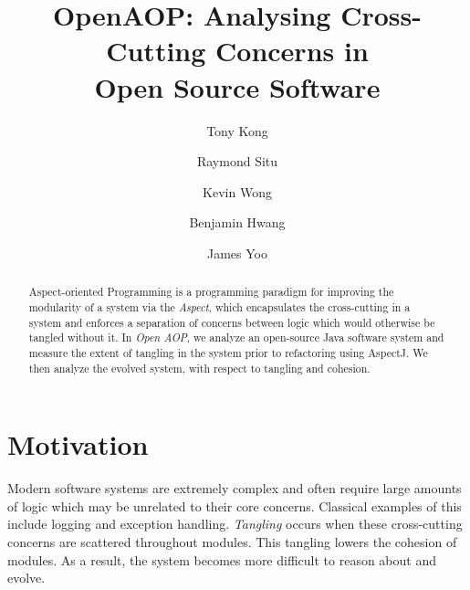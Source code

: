 \documentclass[sigconf]{acmart}
\begin{document}
\title{OpenAOP: Analysing Cross-Cutting Concerns in \protect\\ Open Source Software}

\author{Tony Kong}

\author{Raymond Situ}

\author{Kevin Wong}

\author{Benjamin Hwang}

\author{James Yoo}

\begin{abstract}
Aspect-oriented Programming is a programming paradigm for improving the modularity of a system via the \textit{Aspect}, which encapsulates the cross-cutting in a system and enforces a separation of concerns between logic which would otherwise be tangled without it. In \textit{Open AOP}, we analyze an open-source Java software system and measure the extent of tangling in the system prior to refactoring using AspectJ. We then analyze the evolved system, with respect to tangling and cohesion.
\end{abstract}

\maketitle

\section{Motivation}
Modern software systems are extremely complex and often require large amounts of logic which may be unrelated to their core concerns. Classical examples of this include logging and exception handling. \textit{Tangling} occurs when these cross-cutting concerns are scattered throughout modules. This tangling lowers the cohesion of modules. As a result, the system becomes more difficult to reason about and evolve.
\end{document}
